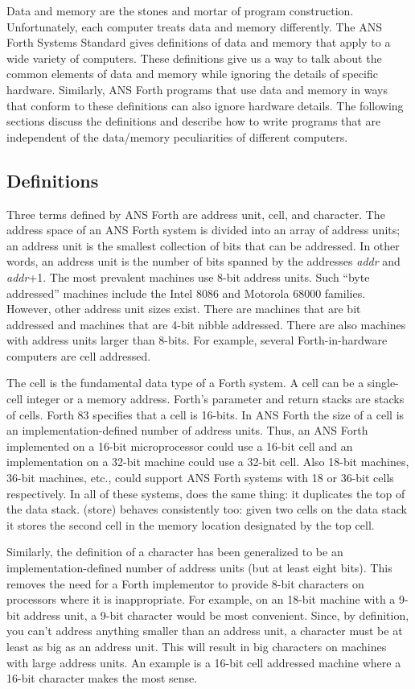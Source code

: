 Data and memory are the stones and mortar of program construction.
Unfortunately, each computer treats data and memory differently. The
ANS Forth Systems Standard gives definitions of data and memory that
apply to a wide variety of computers. These definitions give us a way
to talk about the common elements of data and memory while ignoring
the details of specific hardware. Similarly, ANS Forth programs that
use data and memory in ways that conform to these definitions can
also ignore hardware details. The following sections discuss the
definitions and describe how to write programs that are independent
of the data/memory peculiarities of different computers.

\subsection{Definitions} %

Three terms defined by ANS Forth are address unit, cell, and character.
The address space of an ANS Forth system is divided into an array of
address units; an address unit is the smallest collection of bits that
can be addressed. In other words, an address unit is the number of
bits spanned by the addresses \emph{addr} and \emph{addr}+1. The most
prevalent machines use 8-bit address units. Such ``byte addressed''
machines include the Intel 8086 and Motorola 68000 families. However,
other address unit sizes exist. There are machines that are bit
addressed and machines that are 4-bit nibble addressed. There are
also machines with address units larger than 8-bits. For example,
several Forth-in-hardware computers are cell addressed.

The cell is the fundamental data type of a Forth system. A cell can
be a single-cell integer or a memory address. Forth's parameter and
return stacks are stacks of cells. Forth 83 specifies that a cell is
16-bits. In ANS Forth the size of a cell is an implementation-defined
number of address units. Thus, an ANS Forth implemented on a 16-bit
microprocessor could use a 16-bit cell and an implementation on a
32-bit machine could use a 32-bit cell. Also 18-bit machines, 36-bit
machines, etc., could support ANS Forth systems with 18 or 36-bit
cells respectively. In all of these systems,  does the same
thing: it duplicates the top of the data stack. \word{!} (store)
behaves consistently too: given two cells on the data stack it
stores the second cell in the memory location designated by the
top cell.

Similarly, the definition of a character has been generalized to be
an implementation-defined number of address units (but at least eight
bits). This removes the need for a Forth implementor to provide 8-bit
characters on processors where it is inappropriate. For example, on
an 18-bit machine with a 9-bit address unit, a 9-bit character would
be most convenient. Since, by definition, you can't address anything
smaller than an address unit, a character must be at least as big as
an address unit. This will result in big characters on machines with
large address units. An example is a 16-bit cell addressed machine
where a 16-bit character makes the most sense.

